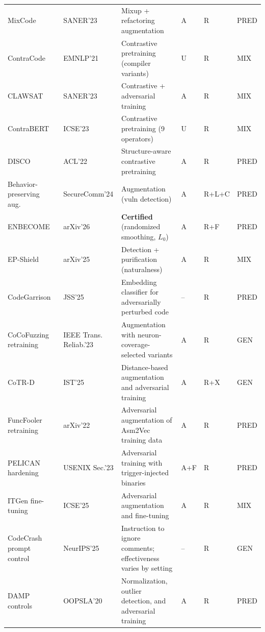 \documentclass[acmsmall,screen,review,nonacm]{acmart}
\begin{document}
{\begin{longtable}{@{}L{2.50cm} L{1.60cm} L{5.15cm} C{0.70cm} L{1.05cm} C{0.75cm}@{}}
MixCode~\cite{dong2023mixcode} & SANER'23 & Mixup + refactoring augmentation & A & R & \textsf{PRED} \\
ContraCode~\cite{jain2021contracode} & EMNLP'21 & Contrastive pretraining (compiler variants) & U & R & \textsf{MIX} \\
CLAWSAT~\cite{jia2023clawsat} & SANER'23 & Contrastive + adversarial training & A & R & \textsf{MIX} \\
ContraBERT~\cite{liu2023contrabert} & ICSE'23 & Contrastive pretraining (9 operators) & U & R & \textsf{MIX} \\
DISCO~\cite{ding2022disco} & ACL'22 & Structure-aware contrastive pretraining & A & R & \textsf{PRED} \\
Behavior-preserving aug.~\cite{qi2024semantic} & SecureComm\newline'24 & Augmentation (vuln detection) & A & R+\allowbreak L+\allowbreak C & \textsf{PRED} \\
ENBECOME~\cite{han2026enbecome} & arXiv'26 & \textbf{Certified} (randomized smoothing, $L_0$) & A & R+\allowbreak F & \textsf{PRED} \\
EP-Shield~\cite{mu2025epshield} & arXiv'25 & Detection + purification (naturalness) & A & R & \textsf{MIX} \\
CodeGarrison~\cite{ghannoum2025codegarrison} & JSS'25 & Embedding classifier for adversarially perturbed code & -- & R & \textsf{PRED} \\
CoCoFuzzing retraining~\cite{wei2022cocofuzzing} & IEEE Trans. Reliab.'23 & Augmentation with neuron-coverage-selected variants & A & R & \textsf{GEN} \\
CoTR-D~\cite{yang2025cotr} & IST'25 & Distance-based augmentation and adversarial training & A & R+\allowbreak X & \textsf{GEN} \\
FuncFooler retraining~\cite{funcfooler2022} & arXiv'22 & Adversarial augmentation of Asm2Vec training data & A & R & \textsf{PRED} \\
PELICAN hardening~\cite{pelican2023} & USENIX Sec.'23 & Adversarial training with trigger-injected binaries & A+F & R & \textsf{PRED} \\
ITGen fine-tuning~\cite{huang2025iterative} & ICSE'25 & Adversarial augmentation and fine-tuning & A & R & \textsf{MIX} \\
CodeCrash prompt control~\cite{codecrash2025} & NeurIPS'25 & Instruction to ignore comments; effectiveness varies by setting & -- & R & \textsf{GEN} \\
DAMP controls~\cite{yefet2020adversarial} & OOPSLA'20 & Normalization, outlier detection, and adversarial training & A & R & \textsf{PRED} \\

\end{longtable}}
\end{document}
